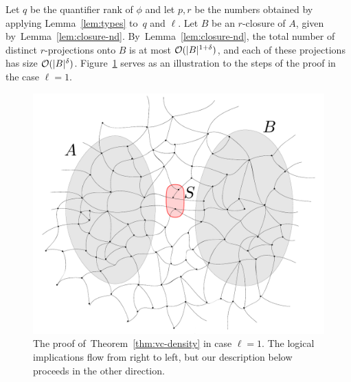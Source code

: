 Let $q$ be the quantifier rank of $\phi$ and let $p,r$ be the numbers
obtained by applying Lemma~\ref{lem:types} to~$q$ and $\ell$.  Let $B$
be an $r$-closure of $A$, given by~Lemma~\ref{lem:closure-nd}.
By~Lemma~\ref{lem:closure-nd}, the total number of distinct
$r$-projections onto $B$ is at most $\mathcal{O}(|B|^{1+\delta})$, and each
of these projections has size $\mathcal{O}(|B|^{\delta})$.
Figure~\ref{fig:sketch} serves as an illustration to the steps of the
proof in the case $\ell=1$.
\begin{figure}[h!]
  \centering
  \includegraphics[width=\textwidth,scale=0.346,page=4]{pics}
%
%
  \caption{The proof of~Theorem~\ref{thm:vc-density} in case $\ell=1$.
    The logical implications flow from right to left, but our
    description below proceeds in the other direction.  }
  \label{fig:sketch}
\end{figure}
	
